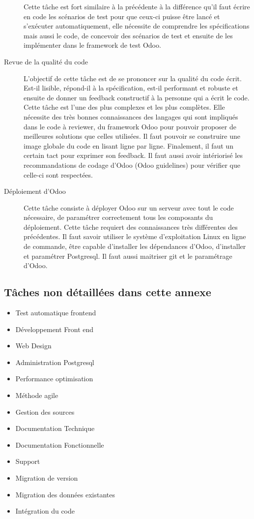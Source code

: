\begin{description}
    Cette tâche est fort similaire à la précédente à la différence qu'il faut écrire en code les scénarios de test pour que ceux-ci puisse être lancé et s'exécuter automatiquement, elle nécessite de comprendre les spécifications mais aussi le code, de concevoir des scénarios de test et ensuite de les implémenter dans le framework de test Odoo. 
    \item[Revue de la qualité du code]
    L'objectif de cette tâche est de se prononcer sur la qualité du code écrit. Est-il lisible, répond-il à la spécification, est-il performant et robuste et ensuite de donner un feedback constructif à la personne qui a écrit le code. Cette tâche est l'une des plus complexes et les plus complètes. Elle nécessite des très bonnes connaissances des langages qui sont impliqués dans le code à reviewer, du framework Odoo pour pouvoir proposer de meilleures solutions que celles utilisées. Il faut pouvoir se construire une image globale du code en lisant ligne par ligne. Finalement, il faut un certain tact pour exprimer son feedback. Il faut aussi avoir intériorisé les recommandations de codage d'Odoo (Odoo guidelines) pour vérifier que celle-ci sont respectées. 
    \item[Déploiement d'Odoo] Cette tâche consiste à déployer Odoo sur un serveur avec tout le code nécessaire, de paramétrer correctement tous les composants du déploiement. 
    Cette tâche requiert des connaissances très différentes des précédentes. Il faut savoir utiliser le système d'exploitation Linux en ligne de commande, être capable d'installer les dépendances d'Odoo, d'installer et paramétrer Postgresql. Il faut aussi maitriser git et le paramétrage d'Odoo. 
\end{description}

\subsection{Tâches non détaillées dans cette annexe}


\begin{itemize}
 \item Test automatique frontend
 \item Développement Front end
 \item Web Design
 \item Administration Postgresql
 \item Performance optimisation
 \item Méthode agile
 \item Gestion des sources
 \item Documentation Technique
 \item Documentation Fonctionnelle
 \item Support
 \item Migration de version 
 \item Migration des données existantes
 \item Intégration du code
\end{itemize}


